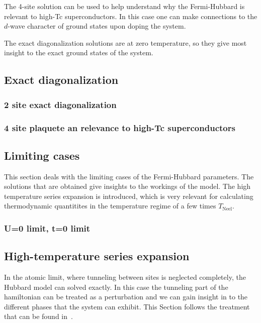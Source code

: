 \documentclass[oneside,11pt]{memoir}
\begin{document}
The 4-site solution can be used to help understand why the Fermi-Hubbard is relevant to high-Tc superconductors.   In this case one can make connections to the $d$-wave character of ground states upon doping the system.   

The exact diagonalization solutions are at zero temperature, so they give most
insight to the exact ground states of the system. 

\subsection{ Exact diagonalization } 
\subsubsection { 2 site exact diagonalization } 
\subsubsection { 4 site plaquete an relevance to high-Tc superconductors}

\subsection{ Limiting cases} 

This section deals with the limiting cases of the Fermi-Hubbard parameters.
The solutions that are obtained give insights to the workings of the model.
The high temperature series expansion is introduced, which is very relevant for
calculating thermodynamic quantitites in the temperature regime of a few times
$T_{\mathrm{Neel}}$.  



\subsubsection { U=0 limit, t=0 limit }



\subsection{ High-temperature series expansion  }

In the atomic limit, where tunneling between sites is neglected completely, the
Hubbard model can solved exactly.  In this case the tunneling part of the
hamiltonian can be treated as a perturbation and we can gain insight in to the
different phases that the system can exhibit.  This Section follows the
treatment that can be found in~\cite{Henderson1992,Jordens2010}.   
\end{document}

